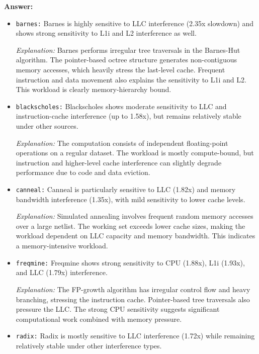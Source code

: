 \begin{enumerate}
\begin{enumerate}
\textbf{Answer:}

\begin{itemize}

\item \texttt{barnes:} Barnes is highly sensitive to LLC interference (2.35x slowdown) and shows strong sensitivity to L1i and L2 interference as well.

\textit{Explanation:} Barnes performs irregular tree traversals in the Barnes-Hut algorithm. The pointer-based octree structure generates non-contiguous memory accesses, which heavily stress the last-level cache. Frequent instruction and data movement also explains the sensitivity to L1i and L2. This workload is clearly memory-hierarchy bound.

\item \texttt{blackscholes:} Blackscholes shows moderate sensitivity to LLC and instruction-cache interference (up to 1.58x), but remains relatively stable under other sources.

\textit{Explanation:} The computation consists of independent floating-point operations on a regular dataset. The workload is mostly compute-bound, but instruction and higher-level cache interference can slightly degrade performance due to code and data eviction.

\item \texttt{canneal:} Canneal is particularly sensitive to LLC (1.82x) and memory bandwidth interference (1.35x), with mild sensitivity to lower cache levels.

\textit{Explanation:} Simulated annealing involves frequent random memory accesses over a large netlist. The working set exceeds lower cache sizes, making the workload dependent on LLC capacity and memory bandwidth. This indicates a memory-intensive workload.

\item \texttt{freqmine:} Freqmine shows strong sensitivity to CPU (1.88x), L1i (1.93x), and LLC (1.79x) interference.

\textit{Explanation:} The FP-growth algorithm has irregular control flow and heavy branching, stressing the instruction cache. Pointer-based tree traversals also pressure the LLC. The strong CPU sensitivity suggests significant computational work combined with memory pressure.

\item \texttt{radix:} Radix is mostly sensitive to LLC interference (1.72x) while remaining relatively stable under other interference types.


\end{itemize}
\end{enumerate}
\end{enumerate}
